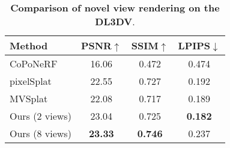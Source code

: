 % 

\begin{table}
\centering
\caption{\textbf{Comparison of novel view rendering on the DL3DV}.}
\small
\begin{tabular}{l| c c c}
\toprule
Method & PSNR$\uparrow$ & SSIM$\uparrow$ & LPIPS$\downarrow$ \\
\midrule
CoPoNeRF  & 16.06  & 0.472 & 0.474   \\
pixelSplat & 22.55  & 0.727 & 0.192   \\
MVSplat & 22.08 & 0.717 & 0.189 \\
Ours (2 views) & 23.04 & 0.725 & \textbf{0.182} \\ 
Ours (8 views) & \textbf{23.33} & \textbf{0.746} & 0.237  \\

\bottomrule
\end{tabular}
\vspace{-1em}
\label{comparison_results_realestate10k}
\label{tab:nvs-dl3dv}
\end{table}

% 
